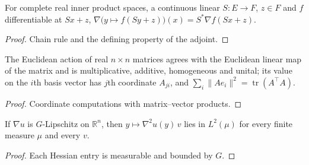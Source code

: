 \begin{lemma}
  \label{lem:gradient-affine-precomposition}
  \leanok
  For complete real inner product spaces, a continuous linear $S:E\to F$, $z\in F$ and $f$ differentiable at $Sx+z$,
  $\nabla\bigl(y\mapsto f(Sy+z)\bigr)(x)=S^{*}\nabla f(Sx+z)$.
\end{lemma}
\begin{proof}
  \leanok
  Chain rule and the defining property of the adjoint.
\end{proof}

\begin{lemma}
  \label{lem:matrix-action-algebra}
  \leanok
  The Euclidean action of real $n\times n$ matrices agrees with the Euclidean linear map of the matrix and is
  multiplicative, additive, homogeneous and unital; its value on the $i$th basis vector has $j$th coordinate $A_{ji}$, and
  $\sum_i\|Ae_i\|^2=\operatorname{tr}(A^{\top}A)$.
\end{lemma}
\begin{proof}
  \leanok
  Coordinate computations with matrix--vector products.
\end{proof}

\begin{lemma}
  \label{lem:hessian-action-l2}
  \leanok
  If $\nabla u$ is $G$-Lipschitz on $\mathbb R^n$, then $y\mapsto\nabla^2u(y)\,v$ lies in $L^2(\mu)$ for every finite measure
  $\mu$ and every $v$.
\end{lemma}
\begin{proof}
  \leanok
  Each Hessian entry is measurable and bounded by $G$.
\end{proof}

